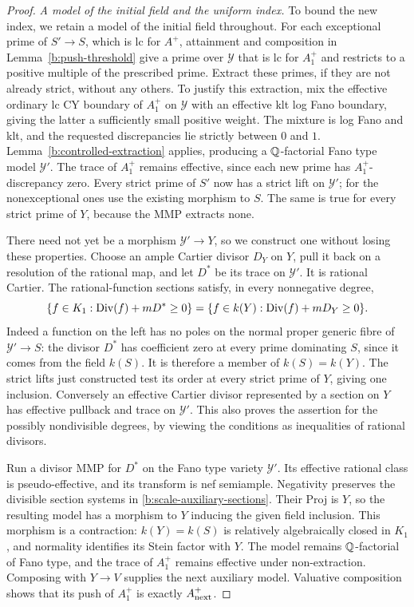 \begin{proof}
\smallskip\noindent
\emph{A model of the initial field and the uniform index.}
To bound the new index, we retain a model of the initial field throughout.  For each exceptional prime of $S'\to S$,
which is lc for $A^+$, attainment and composition in
Lemma~\ref{b:push-threshold} give a prime over $\mathcal Y$ that is
lc for $A_1^+$ and restricts to a positive multiple of the prescribed
prime.  Extract these primes, if they are not already strict, without
any others.  To justify this extraction, mix the effective ordinary
lc CY boundary of $A_1^+$ on $\mathcal Y$ with an effective klt log
Fano boundary, giving the latter a sufficiently small positive weight.
The mixture is log Fano and klt, and the requested discrepancies lie
strictly between $0$ and $1$.  Lemma~\ref{b:controlled-extraction}
applies, producing a $\mathbb Q$-factorial Fano type model $\mathcal Y'$.
The trace of $A_1^+$ remains effective, since each new prime has
$A_1^+$-discrepancy zero.  Every strict prime of $S'$ now has a strict
lift on $\mathcal Y'$; for the nonexceptional ones use the existing
morphism to $S$.  The same is true for every strict prime of $Y$,
because the MMP extracts none.

There need not yet be a morphism $\mathcal Y'\to Y$, so we construct
one without losing these properties.  Choose an ample Cartier divisor
$D_Y$ on $Y$, pull it back on a resolution of the rational map, and
let $D^*$ be its trace on $\mathcal Y'$.  It is rational Cartier.
The rational-function sections satisfy, in every nonnegative degree,
\begin{equation}\label{b:scale-auxiliary-sections}
 \{f\in K_1:\operatorname{Div}(f)+mD^*\ge0\}
 =\{f\in k(Y):\operatorname{Div}(f)+mD_Y\ge0\}.
\end{equation}
Indeed a function on the left has no poles on the normal proper generic
fibre of $\mathcal Y'\to S$: the divisor $D^*$ has coefficient zero
at every prime dominating $S$, since it comes from the field $k(S)$.
It is therefore a member of $k(S)=k(Y)$.  The strict lifts just
constructed test its order at every strict prime of $Y$, giving one
inclusion.  Conversely an effective Cartier divisor represented by a
section on $Y$ has effective pullback and trace on $\mathcal Y'$.
This also proves the assertion for the possibly nondivisible degrees,
by viewing the conditions as inequalities of rational divisors.

Run a divisor MMP for $D^*$ on the Fano type variety $\mathcal Y'$.
Its effective rational class is pseudo-effective, and its transform
is nef semiample.  Negativity preserves the divisible section systems
in \eqref{b:scale-auxiliary-sections}.  Their Proj is $Y$, so the
resulting model has a morphism to $Y$ inducing the given field
inclusion.  This morphism is a contraction: $k(Y)=k(S)$ is relatively
algebraically closed in $K_1$, and normality identifies its Stein
factor with $Y$.  The model remains $\mathbb Q$-factorial of Fano type, and
the trace of $A_1^+$ remains effective under non-extraction.
Composing with $Y\to V$ supplies the next auxiliary model.
Valuative composition shows that its push of $A_1^+$ is exactly
$A^+_{\rm next}$.


\end{proof}
